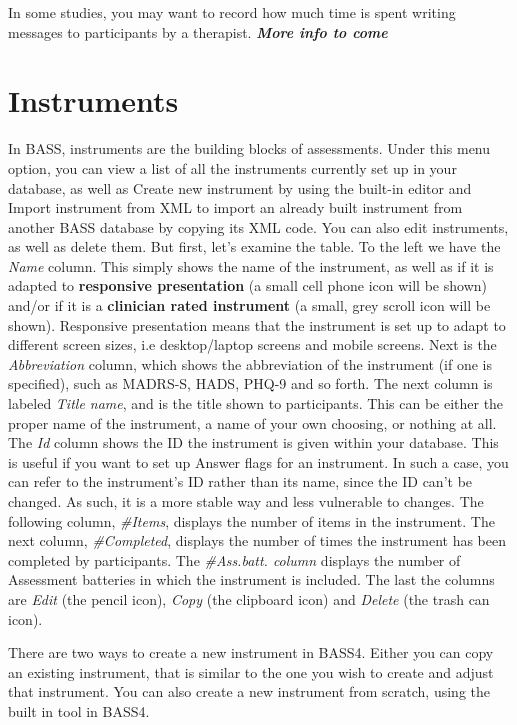 \documentclass[]{book}
\begin{document}
In some studies, you may want to record how much time is spent writing messages to participants by a therapist. \emph{\textbf{More info to come}}

\hypertarget{instruments}{%
\chapter{Instruments}\label{instruments}}

In BASS, instruments are the building blocks of assessments. Under this menu option, you can view a list of all the instruments currently set up in your database, as well as Create new instrument by using the built-in editor and Import instrument from XML to import an already built instrument from another BASS database by copying its XML code. You can also edit instruments, as well as delete them.
But first, let's examine the table.
To the left we have the \emph{Name} column. This simply shows the name of the instrument, as well as if it is adapted to \textbf{responsive presentation} (a small cell phone icon will be shown) and/or if it is a \textbf{clinician rated instrument} (a small, grey scroll icon will be shown). Responsive presentation means that the instrument is set up to adapt to different screen sizes, i.e desktop/laptop screens and mobile screens.
Next is the \emph{Abbreviation} column, which shows the abbreviation of the instrument (if one is specified), such as MADRS-S, HADS, PHQ-9 and so forth.
The next column is labeled \emph{Title name}, and is the title shown to participants. This can be either the proper name of the instrument, a name of your own choosing, or nothing at all.
The \emph{Id} column shows the ID the instrument is given within your database. This is useful if you want to set up Answer flags for an instrument. In such a case, you can refer to the instrument's ID rather than its name, since the ID can't be changed. As such, it is a more stable way and less vulnerable to changes.
The following column, \emph{\#Items}, displays the number of items in the instrument.
The next column, \emph{\#Completed}, displays the number of times the instrument has been completed by participants.
The \emph{\#Ass.batt. column} displays the number of Assessment batteries in which the instrument is included.
The last the columns are \emph{Edit} (the pencil icon), \emph{Copy} (the clipboard icon) and \emph{Delete} (the trash can icon).

There are two ways to create a new instrument in BASS4. Either you can copy an existing instrument, that is similar to the one you wish to create and adjust that instrument. You can also create a new instrument from scratch, using the built in tool in BASS4.
\end{document}
